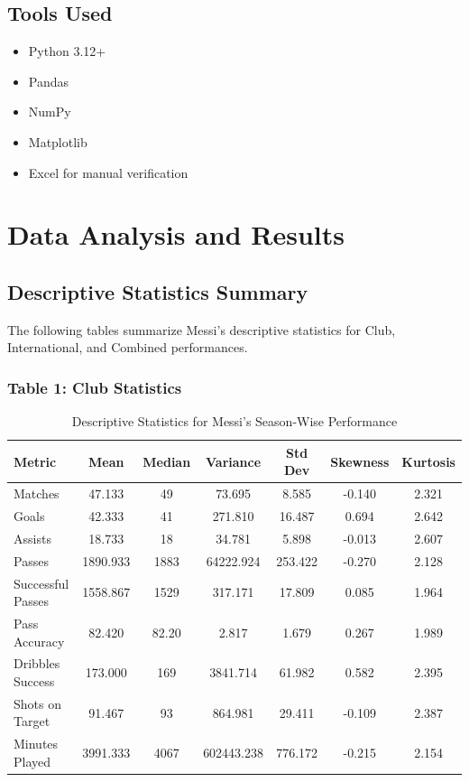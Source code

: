 \documentclass[12pt,a4paper]{report}
\begin{document}
\begin{titlepage}
\section*{Tools Used}
\begin{itemize}
    \item Python 3.12+
    \item Pandas
    \item NumPy
    \item Matplotlib
    \item Excel for manual verification
\end{itemize}

\chapter{Data Analysis and Results}

\section{Descriptive Statistics Summary}
The following tables summarize Messi’s descriptive statistics for Club, International, and Combined performances.  

\subsection*{Table 1: Club Statistics}
\begin{table}[H]
\centering
\begin{table}[H]
\centering
\begin{tabular}{lcccccc}
\toprule
\textbf{Metric} & \textbf{Mean} & \textbf{Median} & \textbf{Variance} & \textbf{Std Dev} & \textbf{Skewness} & \textbf{Kurtosis} \\
\midrule
Matches & 47.133 & 49 & 73.695 & 8.585 & -0.140 & 2.321 \\
Goals & 42.333 & 41 & 271.810 & 16.487 & 0.694 & 2.642 \\
Assists & 18.733 & 18 & 34.781 & 5.898 & -0.013 & 2.607 \\
Passes & 1890.933 & 1883 & 64222.924 & 253.422 & -0.270 & 2.128 \\
Successful Passes & 1558.867 & 1529 & 317.171 & 17.809 & 0.085 & 1.964 \\
Pass Accuracy & 82.420 & 82.20 & 2.817 & 1.679 & 0.267 & 1.989 \\
Dribbles Success & 173.000 & 169 & 3841.714 & 61.982 & 0.582 & 2.395 \\
Shots on Target & 91.467 & 93 & 864.981 & 29.411 & -0.109 & 2.387 \\
Minutes Played & 3991.333 & 4067 & 602443.238 & 776.172 & -0.215 & 2.154 \\
\bottomrule
\end{tabular}
\caption{Descriptive Statistics for Messi’s Season-Wise Performance}
\end{table}


\end{table}
\end{titlepage}
\end{document}
